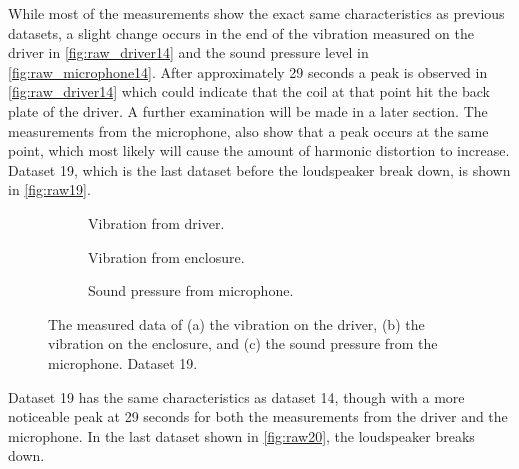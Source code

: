 While most of the measurements show the exact same characteristics as previous datasets, a slight change occurs in the end of the vibration measured on the driver in \autoref{fig:raw_driver14} and the sound pressure level in \autoref{fig:raw_microphone14}. After approximately 29 seconds a peak is observed in \autoref{fig:raw_driver14} which could indicate that the coil at that point hit the back plate of the driver. A further examination will be made in a later section. The measurements from the microphone, also show that a peak occurs at the same point, which most likely will cause the amount of harmonic distortion to increase. Dataset 19, which is the last dataset before the loudspeaker break down, is shown in \autoref{fig:raw19}.

\begin{figure}[H]
\centering
\begin{subfigure}[t]{0.335\textwidth}
	
	\caption{Vibration from driver.}
	\label{fig:raw_driver19}
\end{subfigure}
\begin{subfigure}[t]{0.3\textwidth}
	
	\caption{Vibration from enclosure.}
	\label{fig:raw_enclosure19}
\end{subfigure}
\begin{subfigure}[t]{0.3\textwidth}
	
	\caption{Sound pressure from microphone.}
	\label{fig:raw_microphone19}
\end{subfigure}
\caption{The measured data of (a) the vibration on the driver, (b) the vibration on the enclosure, and (c) the sound pressure from the microphone. Dataset 19.}
\label{fig:raw19}
\end{figure} 

Dataset 19 has the same characteristics as dataset 14, though with a more noticeable peak at 29 seconds for both the measurements from the driver and the microphone. In the last dataset shown in \autoref{fig:raw20}, the loudspeaker breaks down.


